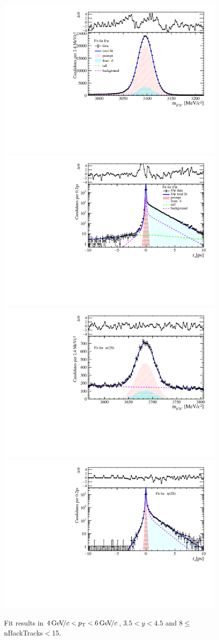 \begin{figure}[H]
\begin{center}
\includegraphics[width=0.47\linewidth]{pdf/Jpsi/drawmassB/n2y3pt3.pdf}
\includegraphics[width=0.47\linewidth]{pdf/Jpsi/2DFitB/n2y3pt3.pdf}
\vspace*{-0.5cm}
\includegraphics[width=0.47\linewidth]{pdf/Psi2S/drawmassB/n2y3pt3.pdf}
\includegraphics[width=0.47\linewidth]{pdf/Psi2S/2DFitB/n2y3pt3.pdf}
\vspace*{-0.5cm}
\end{center}
\caption{Fit results in $4\text{\,Ge\kern -0.1em V\!/}c<p_{\mathrm{T}}<6\text{\,Ge\kern -0.1em V\!/}c$, $3.5<y<4.5$ and 8$\leq$nBackTracks$<$15.}
\label{Fitn2y3pt3}
\end{figure}
